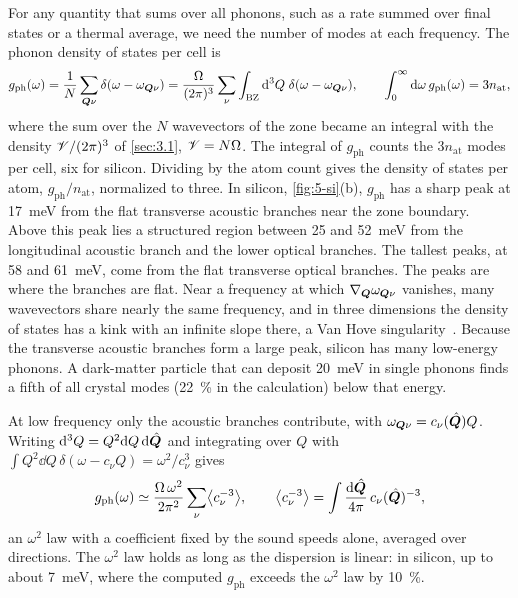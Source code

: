 For any quantity that sums over all phonons, such as a rate summed over final states or a thermal average, we need the number of modes at each frequency. The phonon density of states per cell is
\begin{equation}
  g_{\mathrm{ph}}(\omega) = \frac1N\sum_{\bm{Q}\nu}\delta(\omega - \omega_{\bm{Q}\nu}) = \frac{\Omega}{(2\pi)^3}\sum_\nu\int_{\mathrm{BZ}}\mathrm{d}^3Q\;\delta(\omega - \omega_{\bm{Q}\nu}) ,
  \qquad \int_0^\infty\mathrm{d}\omega\,g_{\mathrm{ph}}(\omega) = 3n_{\mathrm{at}} ,
  \label{eq:5.2-dos}
\end{equation}
where the sum over the $N$ wavevectors of the zone became an integral with the density $\mathscr{V}/(2\pi)^3$ of \cref{sec:3.1}, $\mathscr{V} = N\Omega$. The integral of $g_{\mathrm{ph}}$ counts the $3n_{\mathrm{at}}$ modes per cell, six for silicon. Dividing by the atom count gives the density of states per atom, $g_{\mathrm{ph}}/n_{\mathrm{at}}$, normalized to three. In silicon, \cref{fig:5-si}(b), $g_{\mathrm{ph}}$ has a sharp peak at \SI{17}{meV} from the flat transverse acoustic branches near the zone boundary. Above this peak lies a structured region between 25 and \SI{52}{meV} from the longitudinal acoustic branch and the lower optical branches. The tallest peaks, at 58 and \SI{61}{meV}, come from the flat transverse optical branches. The peaks are where the branches are flat. Near a frequency at which $\nabla_{\bm{Q}}\omega_{\bm{Q}\nu}$ vanishes, many wavevectors share nearly the same frequency, and in three dimensions the density of states has a kink with an infinite slope there, a Van Hove singularity~\cite[Chap.~23]{ashcroft1976solid}. Because the transverse acoustic branches form a large peak, silicon has many low-energy phonons. A dark-matter particle that can deposit \SI{20}{meV} in single phonons finds a fifth of all crystal modes (\SI{22}{\percent} in the calculation) below that energy.

At low frequency only the acoustic branches contribute, with $\omega_{\bm{Q}\nu} = c_\nu(\hat{\bm{Q}})Q$. Writing $\mathrm{d}^3Q = Q^2\mathrm{d} Q\,\mathrm{d}\hat{\bm{Q}}$ and integrating over $Q$ with $\int Q^2\dd Q\,\delta(\omega - c_\nu Q) = \omega^2/c_\nu^3$ gives
\begin{equation}
  g_{\mathrm{ph}}(\omega) \simeq \frac{\Omega\,\omega^2}{2\pi^2}\sum_\nu\bigl\langle c_\nu^{-3}\bigr\rangle , \qquad
  \bigl\langle c_\nu^{-3}\bigr\rangle = \int\frac{\mathrm{d}\hat{\bm{Q}}}{4\pi}\,c_\nu(\hat{\bm{Q}})^{-3} ,
  \label{eq:5.2-dosac}
\end{equation}
an $\omega^2$ law with a coefficient fixed by the sound speeds alone, averaged over directions. The $\omega^2$ law holds as long as the dispersion is linear: in silicon, up to about \SI{7}{meV}, where the computed $g_{\mathrm{ph}}$ exceeds the $\omega^2$ law by \SI{10}{\percent}.

